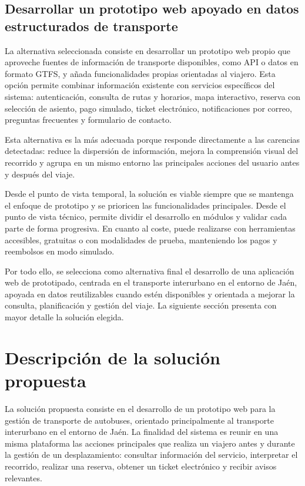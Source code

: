 \subsection{Desarrollar un prototipo web apoyado en datos estructurados de transporte}

La alternativa seleccionada consiste en desarrollar un prototipo web propio que aproveche fuentes de información de transporte disponibles, como API o datos en formato GTFS, y añada funcionalidades propias orientadas al viajero. Esta opción permite combinar información existente con servicios específicos del sistema: autenticación, consulta de rutas y horarios, mapa interactivo, reserva con selección de asiento, pago simulado, ticket electrónico, notificaciones por correo, preguntas frecuentes y formulario de contacto.

Esta alternativa es la más adecuada porque responde directamente a las carencias detectadas: reduce la dispersión de información, mejora la comprensión visual del recorrido y agrupa en un mismo entorno las principales acciones del usuario antes y después del viaje.

Desde el punto de vista temporal, la solución es viable siempre que se mantenga el enfoque de prototipo y se prioricen las funcionalidades principales. Desde el punto de vista técnico, permite dividir el desarrollo en módulos y validar cada parte de forma progresiva. En cuanto al coste, puede realizarse con herramientas accesibles, gratuitas o con modalidades de prueba, manteniendo los pagos y reembolsos en modo simulado.

Por todo ello, se selecciona como alternativa final el desarrollo de una aplicación web de prototipado, centrada en el transporte interurbano en el entorno de Jaén, apoyada en datos reutilizables cuando estén disponibles y orientada a mejorar la consulta, planificación y gestión del viaje. La siguiente sección presenta con mayor detalle la solución elegida.


\section{Descripción de la solución propuesta}
\label{sec:solucion-propuesta}

La solución propuesta consiste en el desarrollo de un prototipo web para la gestión de transporte de autobuses, orientado principalmente al transporte interurbano en el entorno de Jaén. La finalidad del sistema es reunir en una misma plataforma las acciones principales que realiza un viajero antes y durante la gestión de un desplazamiento: consultar información del servicio, interpretar el recorrido, realizar una reserva, obtener un ticket electrónico y recibir avisos relevantes.

